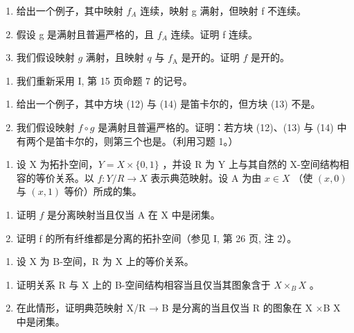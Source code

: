 \begin{enumerate}
\def\labelenumi{\alph{enumi})}
\item
  给出一个例子，其中映射 \(f_{A}\) 连续，映射 g 满射，但映射 f 不连续。
\item
  假设 g 是满射且普遍严格的，且 \(f_{A}\) 连续。证明 f 连续。
\item
  我们假设映射 \(g\) 满射，且映射 \(q\) 与 \(f_{\mathrm{A}}\) 是开的。证明 \(f\) 是开的。
\end{enumerate}

\begin{enumerate}
\def\labelenumi{\arabic{enumi})}
\setcounter{enumi}{1}
\tightlist
\item
  我们重新采用 I, 第 15 页命题 7 的记号。
\end{enumerate}

\begin{enumerate}
\def\labelenumi{\alph{enumi})}
\item
  给出一个例子，其中方块 (12) 与 (14) 是笛卡尔的，但方块 (13) 不是。
\item
  我们假设映射 \(f \circ g\) 是满射且普遍严格的。证明：若方块 (12)、(13) 与 (14) 中有两个是笛卡尔的，则第三个也是。（利用习题 1。）
\end{enumerate}

\exercisegroup

\begin{enumerate}
\def\labelenumi{\arabic{enumi})}
\tightlist
\item
  设 X 为拓扑空间，\(Y = X \times \{0, 1\}\) ，并设 R 为 Y 上与其自然的 X-空间结构相容的等价关系。以 \(f: Y/R \to X\) 表示典范映射。设 A 为由 \(x \in X\) （使 \((x, 0)\) 与 \((x, 1)\) 等价）所成的集。
\end{enumerate}

\begin{enumerate}
\def\labelenumi{\alph{enumi})}
\item
  证明 \(f\) 是分离映射当且仅当 A 在 X 中是闭集。
\item
  证明 f 的所有纤维都是分离的拓扑空间（参见 I, 第 26 页, 注 2）。
\end{enumerate}

\begin{enumerate}
\def\labelenumi{\arabic{enumi})}
\setcounter{enumi}{1}
\tightlist
\item
  设 X 为 B-空间，R 为 X 上的等价关系。
\end{enumerate}

\begin{enumerate}
\def\labelenumi{\alph{enumi})}
\item
  证明关系 R 与 X 上的 B-空间结构相容当且仅当其图象含于 \(X \times_{B} X\) 。
\item
  在此情形，证明典范映射 X/R → B 是分离的当且仅当 R 的图象在 X ×B X 中是闭集。
\end{enumerate}

